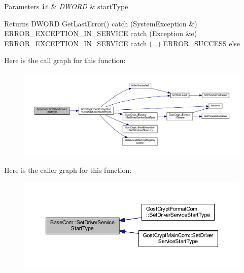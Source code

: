 \begin{DoxyParams}[1]{Parameters}
\mbox{\tt in}  & {\em D\+W\+O\+RD} & start\+Type \\
\hline
\end{DoxyParams}
\begin{DoxyReturn}{Returns}
D\+W\+O\+RD Get\+Last\+Error() catch (System\+Exception \&) E\+R\+R\+O\+R\+\_\+\+E\+X\+C\+E\+P\+T\+I\+O\+N\+\_\+\+I\+N\+\_\+\+S\+E\+R\+V\+I\+CE catch (Exception \&e) E\+R\+R\+O\+R\+\_\+\+E\+X\+C\+E\+P\+T\+I\+O\+N\+\_\+\+I\+N\+\_\+\+S\+E\+R\+V\+I\+CE catch (...) E\+R\+R\+O\+R\+\_\+\+S\+U\+C\+C\+E\+SS else 
\end{DoxyReturn}
Here is the call graph for this function\+:
\nopagebreak
\begin{figure}[H]
\begin{center}
\leavevmode
\includegraphics[width=350pt]{class_base_com_a4c4f6cb8a6560a8a44fa7053d1747ea7_cgraph}
\end{center}
\end{figure}
Here is the caller graph for this function\+:
\nopagebreak
\begin{figure}[H]
\begin{center}
\leavevmode
\includegraphics[width=350pt]{class_base_com_a4c4f6cb8a6560a8a44fa7053d1747ea7_icgraph}
\end{center}
\end{figure}
\mbox{\label{class_base_com_ae0f1340ab68f4c9bb0369afb6bbafa00}} 
